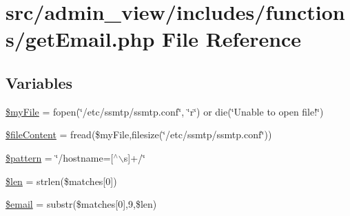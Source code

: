\hypertarget{getEmail_8php}{\section{src/admin\-\_\-view/includes/functions/get\-Email.php \-File \-Reference}
\label{getEmail_8php}
}
\subsection*{\-Variables}
\begin{DoxyCompactItemize}
\item 
\hyperlink{getEmail_8php_aec8c77a99462294dbbfb1639bd8b5165}{\$my\-File} = fopen(\char`\"{}/etc/ssmtp/ssmtp.\-conf\char`\"{}, \char`\"{}r\char`\"{}) or die(\char`\"{}\-Unable to open file!\char`\"{})
\item 
\hyperlink{getEmail_8php_ad89080bb6e501b4f254f01ee5d24fa2d}{\$file\-Content} = fread(\$my\-File,filesize(\char`\"{}/etc/ssmtp/ssmtp.\-conf\char`\"{}))
\item 
\hyperlink{getEmail_8php_af6fbb70c99c1f5a92778615a2a9861e6}{\$pattern} = \char`\"{}/hostname=\mbox{[}$^\wedge$$\backslash$s\mbox{]}+/\char`\"{}
\item 
\hyperlink{getEmail_8php_aa28657aaa5fcc7509dd883662f8accbe}{\$len} = strlen(\$matches\mbox{[}0\mbox{]})
\item 
\hyperlink{getEmail_8php_ad634f418b20382e2802f80532d76d3cd}{\$email} = substr(\$matches\mbox{[}0\mbox{]},9,\$len)
\end{DoxyCompactItemize}


